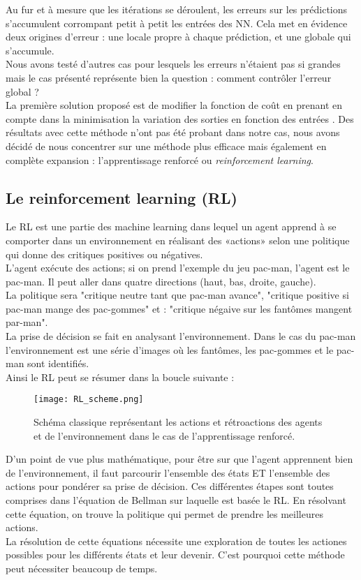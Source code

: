 \documentclass[a4paper,12pt]{article}
\newcommand\bk{\color{black}}
\newcommand\brick{\color{brick}}
\numberwithin{equation}{section} %
\begin{document}
\noindent Au fur et à mesure que les itérations se déroulent, les erreurs sur les prédictions s'accumulent corrompant petit à petit les entrées des NN. Cela met en évidence deux origines d'erreur : une locale propre à chaque prédiction, et une globale qui s'accumule.\\
Nous avons testé d'autres cas pour lesquels les erreurs n'étaient pas si grandes mais le cas présenté représente bien la question : comment contrôler l'erreur global ?\\
La première solution proposé est de modifier la fonction de coût en prenant en compte dans la minimisation la variation des sorties en fonction des entrées \citep{pan2018long}. Des résultats avec cette méthode n'ont pas été probant dans notre cas, nous avons décidé de nous concentrer sur une méthode plus efficace mais également en complète expansion : l'apprentissage renforcé ou \textit{reinforcement learning}.

\brick \subsection{Le reinforcement learning (RL)} \bk
\noindent Le RL est une partie des machine learning dans lequel un agent apprend à se comporter dans un environnement en réalisant des «actions» selon une politique qui donne des critiques positives ou négatives.\\
L'agent exécute des actions; si on prend l'exemple du jeu pac-man, l'agent est le pac-man. Il peut aller dans quatre directions (haut, bas, droite, gauche). \\
La politique sera "critique neutre  tant que pac-man avance", "critique positive si pac-man mange des pac-gommes" et : "critique négaive sur les fantômes mangent par-man".\\
La prise de décision se fait en analysant l'environnement. Dans le cas du pac-man l'environnement est une série d'images où les fantômes, les pac-gommes et le pac-man sont identifiés.\\
 Ainsi le RL peut se résumer dans la boucle suivante : 
\begin{figure}[!ht]
 \centering
 \texttt{[image: RL\_scheme.png]}
 \caption{\small{Schéma classique représentant les actions et rétroactions des agents et de l'environnement dans le cas de l'apprentissage renforcé.}}
 \label{boucleRL}
 \end{figure} 
 
 \noindent D'un point de vue plus mathématique, pour être sur que l'agent apprennent bien de l'environnement, il faut parcourir l'ensemble des états ET l'ensemble des actions pour pondérer sa prise de décision. Ces différentes étapes sont toutes comprises dans l'équation de Bellman sur laquelle est basée le RL. En résolvant cette équation, on trouve la politique qui permet de prendre les meilleures actions. \\
La résolution de cette équations nécessite une exploration de toutes les actiones possibles pour les différents états et leur devenir. C'est pourquoi cette méthode peut nécessiter beaucoup de temps. \\
\end{document}
